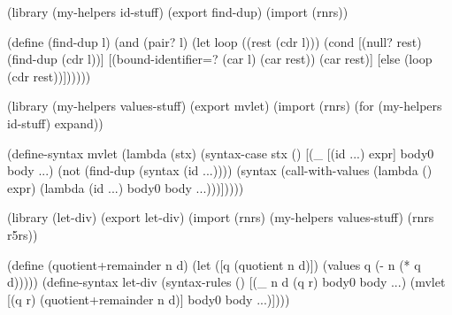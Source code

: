 \begin{schemenoindent}
(library (my-helpers id-stuff)
  (export find-dup)
  (import (rnrs))

  (define (find-dup l)
    (and (pair? l)
         (let loop ((rest (cdr l)))
           (cond
            [(null? rest) (find-dup (cdr l))]
            [(bound-identifier=? (car l) (car rest))
             (car rest)]
            [else (loop (cdr rest))])))))

(library (my-helpers values-stuff)
  (export mvlet)
  (import (rnrs) (for (my-helpers id-stuff) expand))

  (define-syntax mvlet
    (lambda (stx)
      (syntax-case stx ()
        [(\_ [(id ...) expr] body0 body ...)
         (not (find-dup (syntax (id ...))))
         (syntax
           (call-with-values
               (lambda () expr)
             (lambda (id ...) body0 body ...)))]))))

(library (let-div)
  (export let-div)
  (import (rnrs)
          (my-helpers values-stuff)
          (rnrs r5rs))

  (define (quotient+remainder n d)
    (let ([q (quotient n d)])
      (values q (- n (* q d)))))
  (define-syntax let-div
    (syntax-rules ()
     [(\_ n d (q r) body0 body ...)
      (mvlet [(q r) (quotient+remainder n d)]
        body0 body ...)])))%
\end{schemenoindent}


